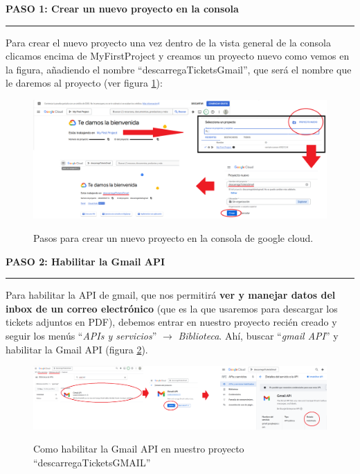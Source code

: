 \documentclass[a4paper,12pt]{report}
\begin{document}
	\noindent \textbf{PASO 1: Crear un nuevo proyecto en la consola}
	\vspace{.2em}
	\hrule
	\vspace{.5em}
	
	Para crear  el nuevo proyecto una vez dentro de la vista general de la consola clicamos encima de MyFirstProject y creamos un proyecto nuevo como vemos en la figura, añadiendo el nombre ``descarregaTicketsGmail'', que será el nombre que le daremos al proyecto (ver figura \ref{fig:googleCloudA}):
	\FloatBarrier
	\setlength{\belowcaptionskip}{3pt}
	\begin{figure}[H]
		\centering
		\caption{Pasos para crear un nuevo proyecto en la consola de google cloud.}
		\includegraphics[width=1\linewidth]{img/googleCloudA.png}
		\label{fig:googleCloudA}
	\end{figure}
	\FloatBarrier
	

	
	
		
	
	
	
	
	
	

	
	\noindent \textbf{PASO 2: Habilitar la Gmail API}
	\vspace{.2em}
	\hrule
	\vspace{.5em}
	
	Para habilitar la API de gmail, que nos permitirá \textbf{ver y manejar datos del inbox de un correo electrónico} (que es la que usaremos para descargar los tickets adjuntos en PDF), debemos entrar en nuestro proyecto recién creado y seguir los menús ``\textit{APIs y servicios}'' $\rightarrow$ \textit{Biblioteca}. Ahí, buscar ``\textit{gmail API}'' y habilitar la Gmail API (figura \ref{fig:googleCloudC}).
	
	\FloatBarrier
	\setlength{\belowcaptionskip}{3pt}
	\begin{figure}[H]
		\centering
		\caption{Como habilitar la Gmail API en nuestro proyecto ``descarregaTicketsGMAIL''}
		\includegraphics[width=1\linewidth]{img/googleCloudC.png}
		\label{fig:googleCloudC}
	\end{figure}
	\FloatBarrier
	
\end{document}
